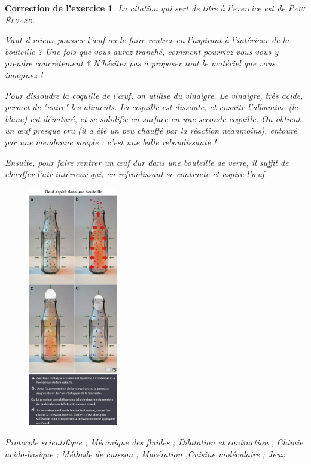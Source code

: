 \documentclass[12pt]{article}
\theoremstyle{break}
\newtheorem{cor}{Correction de l'exercice}
\begin{document}
\begin{cor}
\textit{La citation qui sert de titre à l'exercice est de \textsc{Paul Éluard}.} \newline

\textit{Vaut-il mieux pousser l’œuf ou le faire rentrer en l'aspirant à l'intérieur de la bouteille ? Une fois que vous aurez tranché, comment pourriez-vous vous y prendre concrètement ? N'hésitez pas à proposer tout le matériel que vous imaginez !}

Pour dissoudre la coquille de l’œuf, on utilise du vinaigre. Le vinaigre, très acide, permet de "cuire" les aliments. La coquille est dissoute, et ensuite l'albumine (le blanc) est dénaturé, et se solidifie en surface en une seconde coquille. On obtient un œuf presque cru (il a été un peu chauffé par la réaction néanmoins), entouré par une membrane souple : c'est une balle rebondissante !

Ensuite, pour faire rentrer un œuf dur dans une bouteille de verre, il suffit de chauffer l'air intérieur qui, en refroidissant se contracte et aspire l’œuf.\newline 

\begin{figure}[!ht]
	\centering
    \includegraphics[width=0.35\textwidth]{ExplicationOeuf.jpg}
    
\end{figure}

 \textit{Protocole scientifique ; Mécanique des fluides ; Dilatation et contraction ; Chimie acido-basique ; Méthode de cuisson ; Macération ;Cuisine moléculaire ; Jeux}
\end{cor}
\end{document}
